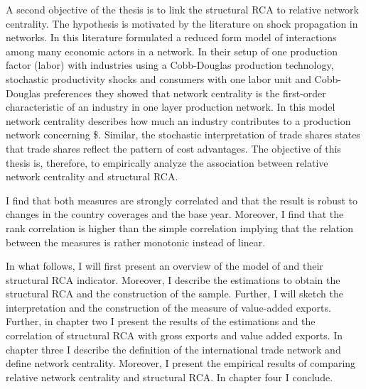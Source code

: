  A second objective of the thesis is to link the structural RCA to relative network centrality. The hypothesis is motivated by the literature on shock propagation in networks. In this literature \textcite{acemoglu2012} formulated a reduced form model of interactions among many economic actors in a network.  In their setup of one production factor (labor) with industries using a Cobb-Douglas production technology, stochastic productivity shocks and consumers with one labor unit and  Cobb-Douglas preferences they showed that network centrality is the first-order characteristic of an industry in one layer production network. In this model network centrality describes how much an industry contributes to a production network concerning \$. Similar, the stochastic interpretation of trade shares states that trade shares reflect the pattern of cost advantages. The objective of this thesis is, therefore, to empirically analyze the association between relative network centrality and structural RCA. \par
I find that both measures are strongly correlated and that the result is robust to changes in the country coverages and the base year. Moreover, I find that the rank correlation is higher than the simple correlation implying that the relation between the measures is rather monotonic instead of linear. 
 \par %
In what follows, I will first present an overview of the model of \textcite{costinot} and their structural  RCA indicator. Moreover, I describe the estimations to obtain the structural RCA and the construction of the sample. Further, I will sketch the interpretation and the construction of the measure of value-added exports.  Further, in chapter two I present the results of the estimations and the correlation of structural RCA with gross exports and value added exports. In chapter three I describe the definition of the international trade network and define network centrality. Moreover, I present the empirical results of comparing relative network centrality and structural RCA. In chapter four I conclude. 
\endinput 
